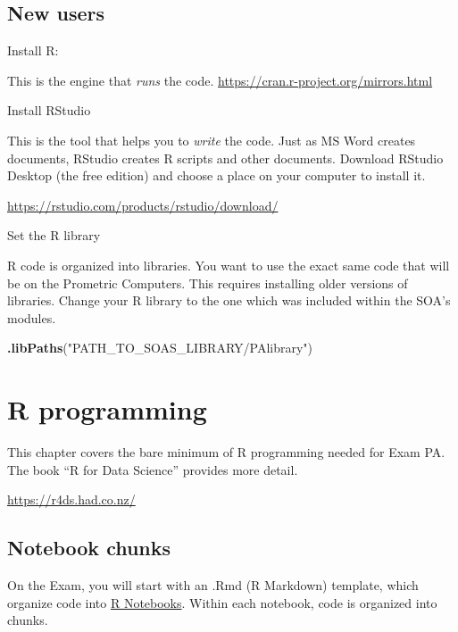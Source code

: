 \documentclass[openany]{book}
\newenvironment{Shaded}{\begin{snugshade}}{\end{snugshade}}
\newcommand{\KeywordTok}[1]{\textcolor[rgb]{0.13,0.29,0.53}{\textbf{#1}}}
\newcommand{\NormalTok}[1]{#1}
\newcommand{\StringTok}[1]{\textcolor[rgb]{0.31,0.60,0.02}{#1}}
\begin{document}
\hypertarget{new-users}{%
\section{New users}\label{new-users}}

Install R:

This is the engine that \emph{runs} the code. \url{https://cran.r-project.org/mirrors.html}

Install RStudio

This is the tool that helps you to \emph{write} the code. Just as MS Word creates documents, RStudio creates R scripts and other documents. Download RStudio Desktop (the free edition) and choose a place on your computer to install it.

\url{https://rstudio.com/products/rstudio/download/}

Set the R library

R code is organized into libraries. You want to use the exact same code that will be on the Prometric Computers. This requires installing older versions of libraries. Change your R library to the one which was included within the SOA's modules.

\begin{Shaded}
\begin{Highlighting}[]
\KeywordTok{.libPaths}\NormalTok{(}\StringTok{"PATH_TO_SOAS_LIBRARY/PAlibrary"}\NormalTok{)}
\end{Highlighting}
\end{Shaded}

\hypertarget{r-programming}{%
\chapter{R programming}\label{r-programming}}

This chapter covers the bare minimum of R programming needed for Exam PA. The book
``R for Data Science'' provides more detail.

\url{https://r4ds.had.co.nz/}

\hypertarget{notebook-chunks}{%
\section{Notebook chunks}\label{notebook-chunks}}

On the Exam, you will start with an .Rmd (R Markdown) template, which organize
code into \href{https://bookdown.org/yihui/rmarkdown/notebook.html}{R Notebooks}.
Within each notebook, code is organized into chunks.
\end{document}
